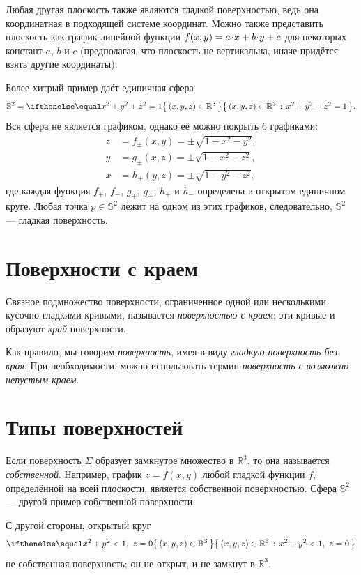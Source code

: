 Любая другая плоскость также являются гладкой поверхностью, ведь она координатная в подходящей системе координат.
Можно также представить плоскость как график линейной функции 
$f(x,y)\z=a\cdot x+b\cdot y+c$ для некоторых констант $a$, $b$ и $c$
(предполагая, что плоскость не вертикальна, иначе придётся взять другие координаты).

Более хитрый пример даёт единичная сфера 
\[\mathbb{S}^2=\set{(x,y,z)\in\mathbb{R}^3}{x^2+y^2+z^2=1}.\]
Вся сфера не является графиком,
однако её можно покрыть 6 графиками:
\begin{align*}
z&=f_\pm(x,y)=\pm \sqrt{1-x^2-y^2},
\\
y&=g_\pm(x,z)=\pm \sqrt{1-x^2-z^2},
\\
x&=h_\pm(y,z)=\pm \sqrt{1-y^2-z^2},
\end{align*}
где каждая функция $f_+$, $f_-$, $g_+$, $g_-$, $h_+$ и $h_-$ определена в открытом единичном круге.
Любая точка $p\in\mathbb{S}^2$ лежит на одном из этих графиков, следовательно, $\mathbb{S}^2$ --- гладкая  поверхность.

\section{Поверхности с краем}

{\sloppy

Связное подмножество поверхности, ограниченное одной или несколькими кусочно гладкими кривыми, называется \emph{поверхностью с краем}; эти кривые и образуют \emph{край} поверхности.

}

Как правило, мы говорим {}\emph{поверхность}, имея в виду {}\emph{гладкую поверхность без края}.
При необходимости, можно использовать термин {}\emph{поверхность с возможно непустым краем}.


\section{Типы поверхностей}

Если поверхность $\Sigma$ образует замкнутое множество в $\mathbb{R}^3$, то она называется \emph{собственной}.
Например, график $z=f(x,y)$ любой гладкой функции $f$, определённой на всей плоскости, является собственной поверхностью.
Сфера $\mathbb{S}^2$ --- другой пример собственной поверхности.

С другой стороны, открытый круг 
\[\set{(x,y,z)\in\mathbb{R}^3}{x^2+y^2<1,\  z=0}\]
не собственная поверхность; он не открыт, и не замкнут в $\mathbb{R}^3$.

